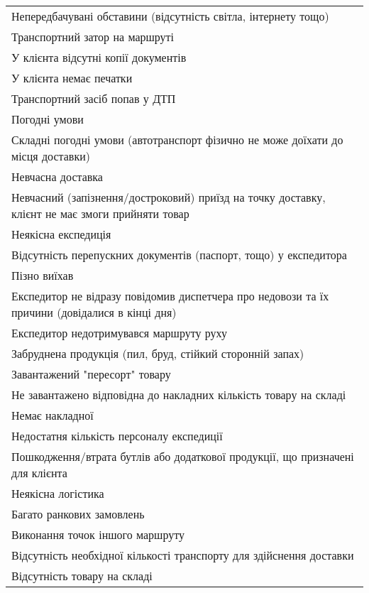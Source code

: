 \begin{longtable}[c]{ | p{16cm} | }
	\nopagebreak\quad Непередбачувані обставини (відсутність світла, інтернету тощо) \\
	\nopagebreak\quad Транспортний затор на маршруті \\
	\nopagebreak\quad У клієнта відсутні копії документів \\
	\nopagebreak\quad У клієнта немає печатки \\
	\nopagebreak\quad Транспортний засіб попав у ДТП \\
	\hline
	Погодні умови \\
	\nopagebreak\quad Складні погодні умови (автотранспорт фізично не може доїхати до місця доставки) \\
	\hline
	Невчасна доставка \\
	\nopagebreak\quad Невчасний (запізнення/достроковий) приїзд на точку доставку, клієнт не має змоги прийняти товар \\
	\hline
	Неякісна експедиція \\
	\nopagebreak\quad Відсутність перепускних документів (паспорт, тощо) у експедитора \\
	\nopagebreak\quad Пізно виїхав \\
	\nopagebreak\quad Експедитор не відразу повідомив диспетчера про недовози та їх причини (довідалися в кінці дня) \\
	\nopagebreak\quad Експедитор недотримувався маршруту руху \\
	\nopagebreak\quad Забруднена продукція (пил, бруд, стійкий сторонній запах) \\
	\nopagebreak\quad Завантажений "пересорт" товару \\
	\nopagebreak\quad Не завантажено відповідна до накладних кількість товару на складі \\
	\nopagebreak\quad Немає  накладної \\
	\nopagebreak\quad Недостатня кількість персоналу експедиції \\
	\nopagebreak\quad Пошкодження/втрата бутлів або додаткової продукції, що призначені для клієнта \\
	\hline
	Неякісна логістика \\
	\nopagebreak\quad Багато ранкових замовлень \\
	\nopagebreak\quad Виконання точок іншого маршруту \\
	\nopagebreak\quad Відсутність необхідної кількості транспорту для здійснення доставки \\
	\nopagebreak\quad Відсутність товару на складі \\

\end{longtable}
